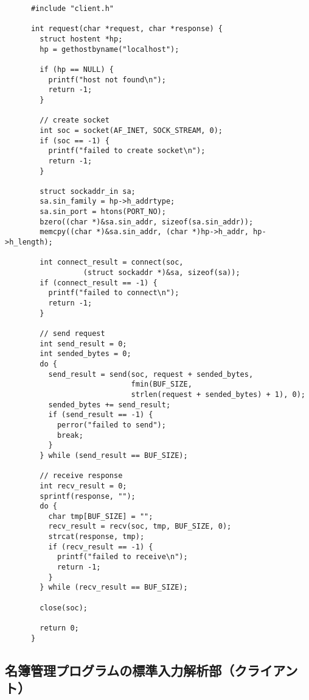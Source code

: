 \documentclass[11pt]{jsarticle}
\begin{document}
\begin{verbatim}
      #include "client.h"

      int request(char *request, char *response) {
        struct hostent *hp;
        hp = gethostbyname("localhost");
      
        if (hp == NULL) {
          printf("host not found\n");
          return -1;
        }
      
        // create socket
        int soc = socket(AF_INET, SOCK_STREAM, 0);
        if (soc == -1) {
          printf("failed to create socket\n");
          return -1;
        }
      
        struct sockaddr_in sa;
        sa.sin_family = hp->h_addrtype;
        sa.sin_port = htons(PORT_NO);
        bzero((char *)&sa.sin_addr, sizeof(sa.sin_addr));
        memcpy((char *)&sa.sin_addr, (char *)hp->h_addr, hp->h_length);
      
        int connect_result = connect(soc, 
                  (struct sockaddr *)&sa, sizeof(sa));
        if (connect_result == -1) {
          printf("failed to connect\n");
          return -1;
        }
      
        // send request
        int send_result = 0;
        int sended_bytes = 0;
        do {
          send_result = send(soc, request + sended_bytes,
                             fmin(BUF_SIZE, 
                             strlen(request + sended_bytes) + 1), 0);
          sended_bytes += send_result;
          if (send_result == -1) {
            perror("failed to send");
            break;
          }
        } while (send_result == BUF_SIZE);
      
        // receive response
        int recv_result = 0;
        sprintf(response, "");
        do {
          char tmp[BUF_SIZE] = "";
          recv_result = recv(soc, tmp, BUF_SIZE, 0);
          strcat(response, tmp);
          if (recv_result == -1) {
            printf("failed to receive\n");
            return -1;
          }
        } while (recv_result == BUF_SIZE);
      
        close(soc);
      
        return 0;
      }
\end{verbatim}

\subsection{名簿管理プログラムの標準入力解析部（クライアント）} \label{sec:meibo_client.c}
\end{document}
